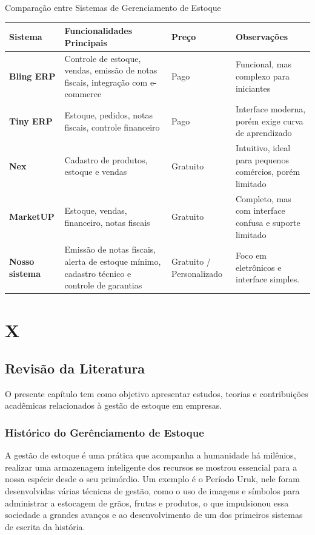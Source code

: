 \documentclass[
	12pt,				%
	openright,			%
	twoside,			%
	a4paper,			%
	english,			%
	french,				%
	spanish,			%
	brazil				%
	]{abntex2}
\begin{document}
\begin{quadro}[htb]
\caption{\label{quadro_comparativo}Comparação entre Sistemas de Gerenciamento de Estoque}
\begin{tabular}{|p{3.2cm}|p{5.5cm}|p{2.2cm}|p{4.1cm}|}
\hline
\textbf{Sistema} & \textbf{Funcionalidades Principais} & \textbf{Preço} & \textbf{Observações} \\
\hline
\textbf{Bling ERP} & Controle de estoque, vendas, emissão de notas fiscais, integração com e-commerce & Pago & Funcional, mas complexo para iniciantes \\
\hline
\textbf{Tiny ERP} & Estoque, pedidos, notas fiscais, controle financeiro & Pago & Interface moderna, porém exige curva de aprendizado \\
\hline
\textbf{Nex} & Cadastro de produtos, estoque e vendas & Gratuito & Intuitivo, ideal para pequenos comércios, porém limitado \\
\hline
\textbf{MarketUP} & Estoque, vendas, financeiro, notas fiscais & Gratuito & Completo, mas com interface confusa e suporte limitado \\
\hline
\textbf{Nosso sistema} & Emissão de notas fiscais, alerta de estoque mínimo, cadastro técnico e controle de garantias & Gratuito / Personalizado & Foco em eletrônicos e interface simples. \\
\hline
\end{tabular}
\end{quadro}


\part{X}



\chapter{Revisão da Literatura}
O presente capítulo tem como objetivo apresentar estudos, teorias e contribuições acadêmicas relacionados à gestão de estoque em empresas.
\section{Histórico do Gerênciamento de Estoque}
A gestão de estoque é uma prática que acompanha a humanidade há milênios, realizar uma armazenagem inteligente dos recursos se mostrou essencial para a nossa espécie desde o seu primórdio. Um exemplo é o Período Uruk, nele foram desenvolvidas várias técnicas de gestão, como o uso de imagens e símbolos para administrar a estocagem de grãos, frutas e produtos, o que impulsionou essa sociedade a grandes avanços e ao desenvolvimento de um dos primeiros sistemas de escrita da história.
\end{document}
